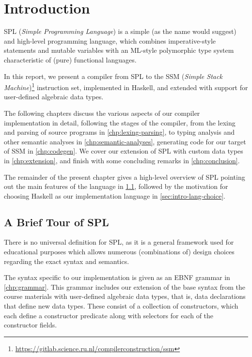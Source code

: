\chapter{Introduction} \label{chp:introduction}

SPL (\emph{Simple Programming Language}) is a simple (as the name would suggest)
and high-level programming language, which combines imperative-style statements
and mutable variables with an ML-style polymorphic type system characteristic of
(pure) functional languages.

In this report, we present a compiler from SPL to the SSM
(\emph{Simple Stack Machine})\footnote{\url{https://gitlab.science.ru.nl/compilerconstruction/ssm}}
instruction set, implemented in Haskell, and extended with support for
user-defined algebraic data types.

The following chapters discuss the various aspects of our compiler
implementation in detail, following the stages of the compiler, from the lexing
and parsing of source programs in \cref{chp:lexing-parsing}, to typing analysis
and other semantic analyses in \cref{chp:semantic-analyses}, generating code for
our target of SSM in \cref{chp:codegen}.
We cover our extension of SPL with custom data types in \cref{chp:extension},
and finish with some concluding remarks in \cref{chp:conclusion}.

The remainder of the present chapter gives a high-level overview of SPL pointing
out the main features of the language in \cref{sec:intro-spl}, followed by the
motivation for choosing Haskell as our implementation language in
\cref{sec:intro-lang-choice}.





\section{A Brief Tour of SPL} \label{sec:intro-spl}

There is no universal definition for SPL, as it is a general framework used for
educational purposes which allows numerous (combinations of) design choices
regarding the exact syntax and semantics.

The syntax specific to our implementation is given as an EBNF grammar in
\cref{chp:grammar}. This grammar includes our extension of the base syntax from
the course materials with user-defined algebraic data types, that is, data
declarations that define new data types.
These consist of a collection of constructors, which each define a constructor
predicate along with selectors for each of the constructor fields.


